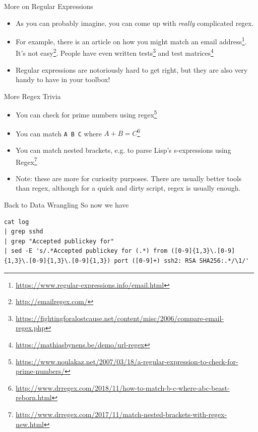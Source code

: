 \documentclass[12pt]{beamer}
\begin{document}
\begin{frame}{More on Regular Expressions}
  \begin{itemize}
    \item As you can probably imagine, you can come up with \emph{really} complicated regex.
    \item For example, there is an article on how you might match an email address\footnote{\url{https://www.regular-expressions.info/email.html}}. It's not easy\footnote{\url{http://emailregex.com/}}. People have even written tests\footnote{\url{https://fightingforalostcause.net/content/misc/2006/compare-email-regex.php}} and test matrices\footnote{\url{https://mathiasbynens.be/demo/url-regex}}
    \item Regular expressions are notoriously hard to get right, but they are also very handy to have in your toolbox!
  \end{itemize}
\end{frame}

\begin{frame}{More Regex Trivia}
  \begin{itemize}
    \item You can check for prime numbers using regex\footnote{\url{https://www.noulakaz.net/2007/03/18/a-regular-expression-to-check-for-prime-numbers/}}
    \item You can match \texttt{A B C} where $A + B = C$\footnote{\url{http://www.drregex.com/2018/11/how-to-match-b-c-where-abc-beast-reborn.html}}
    \item You can match nested brackets, e.g. to parse Lisp's s-expressions using Regex\footnote{\url{http://www.drregex.com/2017/11/match-nested-brackets-with-regex-new.html}}
    \item Note: these are more for curiosity purposes. There are usually better tools than regex, although for a quick and dirty script, regex is usually enough.
  \end{itemize}
\end{frame}

\begin{frame}[fragile]{Back to Data Wrangling}
  So now we have
  \begin{verbatim}
cat log
| grep sshd
| grep "Accepted publickey for"
| sed -E 's/.*Accepted publickey for (.*) from ([0-9]{1,3}\.[0-9]{1,3}\.[0-9]{1,3}\.[0-9]{1,3}) port ([0-9]+) ssh2: RSA SHA256:.*/\1/'
  \end{verbatim}
\end{frame}
\end{document}
